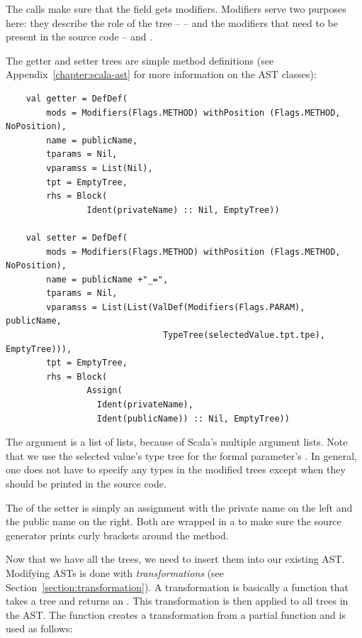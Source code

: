 \documentclass[10pt,a4paper,oneside]{scrreprt}
\begin{document}
The  calls make sure that the field gets  modifiers. Modifiers serve two purposes here: they describe the role of the tree -- \textsc{} -- and the modifiers that need to be present in the source code -- \textsc{} and \textsc{}.

The getter and setter trees are simple method definitions (see Appendix~\vref{chapter:scala-ast} for more information on the AST classes):

\begin{lstlisting}
    val getter = DefDef(
        mods = Modifiers(Flags.METHOD) withPosition (Flags.METHOD, NoPosition), 
        name = publicName, 
        tparams = Nil, 
        vparamss = List(Nil), 
        tpt = EmptyTree, 
        rhs = Block(
                Ident(privateName) :: Nil, EmptyTree))
    
    val setter = DefDef(
        mods = Modifiers(Flags.METHOD) withPosition (Flags.METHOD, NoPosition), 
        name = publicName +"_=",
        tparams = Nil,
        vparamss = List(List(ValDef(Modifiers(Flags.PARAM), publicName, 
                               TypeTree(selectedValue.tpt.tpe), EmptyTree))), 
        tpt = EmptyTree,
        rhs = Block(
                Assign(
                  Ident(privateName),
                  Ident(publicName)) :: Nil, EmptyTree))
\end{lstlisting}

The  argument is a list of lists, because of Scala's multiple argument lists. Note that we use the selected value's type tree for the formal parameter's . In general, one does not have to specify any types in the modified trees except when they should be printed in the source code.

The  of the setter is simply an assignment with the private name on the left and the public name on the right. Both  are wrapped in a  to make sure the source generator prints curly brackets around the method.

Now that we have all the trees, we need to insert them into our existing AST. Modifying ASTs is done with \textit{transformations} (see Section~\vref{section:transformation}). A transformation is basically a function that takes a tree and returns an . This transformation is then applied to all trees in the AST. 
\newpage
The  function creates a transformation from a partial function and is used as follows:
\end{document}
